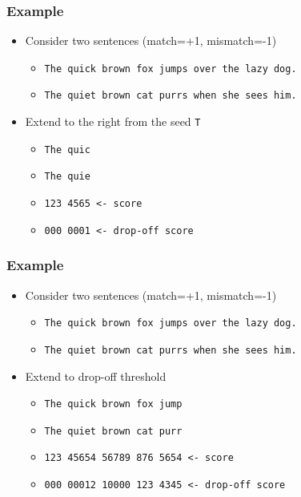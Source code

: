 \documentclass[table]{beamer}
\begin{document}
  \begin{frame}
    \frametitle{Example}
    \begin{itemize}
      \item<1-> Consider two sentences (match=+1, mismatch=-1)
      \begin{itemize}
        \item \texttt{The quick brown fox jumps over the lazy dog.}
        \item \texttt{The quiet brown cat purrs when she sees him.}
      \end{itemize}
      \item<2-> Extend to the right from the seed \texttt{T}
      \begin{itemize}
        \item \texttt{The quic}
        \item \texttt{The quie}
        \item \texttt{123 4565 <- score}
        \item \texttt{000 0001 <- drop-off score}        
      \end{itemize}
    \end{itemize}
  \end{frame}

  \begin{frame}
    \frametitle{Example}
    \begin{itemize}
      \item Consider two sentences (match=+1, mismatch=-1)
      \begin{itemize}
        \item \texttt{The quick brown fox jumps over the lazy dog.}
        \item \texttt{The quiet brown cat purrs when she sees him.}
      \end{itemize}
      \item Extend to drop-off threshold
      \begin{itemize}
        \item \texttt{The quick brown fox jump}
        \item \texttt{The quiet brown cat purr}
        \item \texttt{123 45654 56789 876 5654 <- score}
        \item \texttt{000 00012 10000 123 4345 <- drop-off score}        
      \end{itemize}
    \end{itemize}
  \end{frame}
\end{document}
